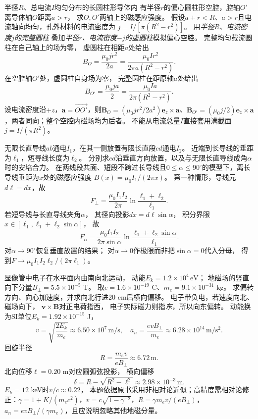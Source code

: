 \problemtext 半径$R$、总电流$I$均匀分布的长圆柱形导体内
有半径$r$的偏心圆柱形空腔，腔轴$O'$离导体轴$O$距离$a>r$，
求$O,O'$两轴上的磁感应强度。
\workings
假设$a+r<R$、$a>r$且电流轴向均匀，孔外材料的电流密度为
$j=I/[\pi(R^2-r^2)]$。
用\emph{半径$R$、电流密度$j$的完整圆柱}
叠加\emph{半径$r$、电流密度$-j$的虚圆柱}模拟偏心空腔。
完整均匀载流圆柱在自己轴上的场为零，
虚圆柱在相距$a$处给出
\[
\boxed{B_O=\frac{\mu_0 j r^2}{2a}
=\frac{\mu_0 I r^2}{2\pi a(R^2-r^2)}}.
\]
在空腔轴$O'$处，虚圆柱自身场为零，
完整圆柱在距原轴$a$处给出
\[
\boxed{B_{O'}=\frac{\mu_0ja}{2}
=\frac{\mu_0Ia}{2\pi(R^2-r^2)}}.
\]
\crosscheck 设电流密度沿$+z$，$\bm a=\overrightarrow{OO'}$，则$\bm B_O=(\mu_0jr^2/2a^2)\bm e_z\times\bm a$、$\bm B_{O'}=(\mu_0j/2)\bm e_z\times\bm a$，两者同向；整个空腔内磁场均为后者。
不能从电流总量$I$直接套用满截面$j=I/(\pi R^2)$。

\problemtext 无限长直导线$ab$通电$I_1$，在其一侧放置有限长直段$cd$通电$I_2$。
近端到长导线的垂距为$\ell_1$，短导线长度为$\ell_2$。
分别求$cd$沿垂直方向放置，以及与无限长直导线成角$\alpha$时的安培合力。
\workings
在两线段共面、短段不跨过长导线且$0\le\alpha\le90^\circ$的模型下，离长导线垂距为$x$处的磁感应强度
$B(x)=\mu_0I_1/(2\pi x)$。
第一种情形，导线元$d\ell=dx$，故
\[
\boxed{F_\perp=\frac{\mu_0 I_1I_2}{2\pi}
\ln\frac{\ell_1+\ell_2}{\ell_1}}.
\]
若短导线与长直导线夹角$\alpha$，
其径向投影$dx=d\ell\sin\alpha$，
积分界限$x\in[\ell_1,\ell_1+\ell_2\sin\alpha]$，
故
\[
\boxed{F_\alpha=
\frac{\mu_0I_1I_2}{2\pi\sin\alpha}
\ln\frac{\ell_1+\ell_2\sin\alpha}{\ell_1}}.
\]
\crosscheck 对$\alpha\to90^\circ$恢复垂直放置的结果；
对$\alpha\to0$作极限而非把$\sin\alpha=0$代入分母，
得到$F\to\mu_0I_1I_2\ell_2/(2\pi\ell_1)$。

\problemtext 显像管中电子在水平面内由南向北运动，
动能$E_k=1.2\times10^4\,\mathrm{eV}$；
地磁场的竖直向下分量$B_\perp=5.5\times10^{-5}$ T。
取$e=1.6\times10^{-19}$ C、$m_e=9.1\times10^{-31}$ kg。
求偏转方向、向心加速度，并求向北行进20 cm后横向偏移。
\workings
电子带负电，若速度向北、磁场向下，
$\bm v\times\bm B$对正电荷指西，
电子实际磁力则指\emph{东}，所以向东偏转。
动能换为SI单位$E_k=1.92\times10^{-15}$ J，
\[
v=\sqrt{\frac{2E_k}{m_e}}\approx6.50\times10^7\,\mathrm{m/s},
\quad
\boxed{a_n=\frac{evB_\perp}{m_e}\approx6.28\times10^{14}\,\mathrm{m/s^2}}.
\]
回旋半径
\[
R=\frac{m_ev}{eB_\perp}\approx6.72\,\mathrm m.
\]
北向位移$\ell=0.20$ m对应圆弧弦投影，
横向偏移
\[
\boxed{\delta=R-\sqrt{R^2-\ell^2}
\approx2.98\times10^{-3}\,\mathrm m}.
\]
\crosscheck $E_k=12$ keV时$v/c\approx0.22$，
本题依据原书采用非相对论近似；高精度需相对论修正：$\gamma=1+K/(m_ec^2)$，$v=c\sqrt{1-\gamma^{-2}}$，$R=\gamma m_ev/(eB_\perp)$，$a_n=e v B_\perp/(\gamma m_e)$，且应说明忽略其他地磁分量。

